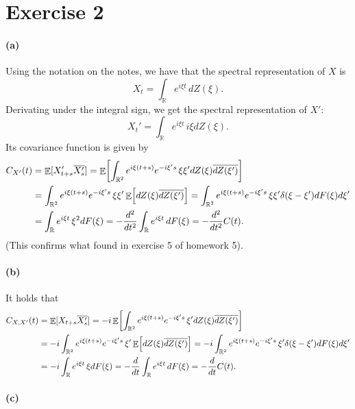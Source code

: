 \documentclass[a4paper,11pt]{article}
\theoremstyle{definition}
\theoremstyle{plain}
\theoremstyle{remark}
\DeclarePairedDelimiter{\parq}{[}{]}
\DeclareMathOperator*{\expval}{\mathbb{E}}
\begin{document}
\section*{Exercise 2}

\paragraph*{(a)}

Using the notation on the notes, we have that the spectral representation of $X$ is 
$$
X_t = \int_\mathbb{R} e^{i\xi t}\,dZ(\xi).
$$
Derivating under the integral sign, we get the spectral representation of $X'$:
$$
X_t' = \int_\mathbb{R} e^{i\xi t}\,i\xi dZ(\xi).
$$
Its covariance function is given by
\begin{align*}
C_{X'}(t) & = \expval\parq{X_{t+s}'\overline{X_s'}} = \expval\parq*{\int_{\mathbb{R}^2} e^{i\xi (t+s)}e^{-i\xi's}\,\xi\xi'dZ(\xi)\overline{dZ(\xi')}} \\ & = \int_{\mathbb{R}^2} e^{i\xi (t+s)}e^{-i\xi's}\,\xi\xi'\expval\parq*{dZ(\xi)\overline{dZ(\xi')}} = \int_{\mathbb{R}^2} e^{i\xi (t+s)}e^{-i\xi's}\,\xi\xi'\delta(\xi-\xi')dF(\xi)d\xi' \\ & = \int_\mathbb{R} e^{i\xi t}\,\xi^2 dF(\xi) = -\frac{d^2}{dt^2}\int_\mathbb{R} e^{i\xi t}\,dF(\xi) = -\frac{d^2}{dt^2}C(t).
\end{align*}
(This confirms what found in exercise 5 of homework 5).

\paragraph*{(b)}
 
It holds that
\begin{align*}
C_{X,X'}(t) & = \expval\parq{X_{t+s}\overline{X_s'}} = -i\expval\parq*{\int_{\mathbb{R}^2} e^{i\xi (t+s)}e^{-i\xi's}\,\xi'dZ(\xi)\overline{dZ(\xi')}} \\ & = -i\int_{\mathbb{R}^2} e^{i\xi (t+s)}e^{-i\xi's}\,\xi'\expval\parq*{dZ(\xi)\overline{dZ(\xi')}} = -i\int_{\mathbb{R}^2} e^{i\xi (t+s)}e^{-i\xi's}\,\xi'\delta(\xi-\xi')dF(\xi)d\xi' \\ & = -i\int_\mathbb{R} e^{i\xi t}\,\xi dF(\xi) = -\frac{d}{dt}\int_\mathbb{R} e^{i\xi t}\,dF(\xi) = -\frac{d}{dt}C(t).
\end{align*} 

\paragraph*{(c)}
\end{document}
